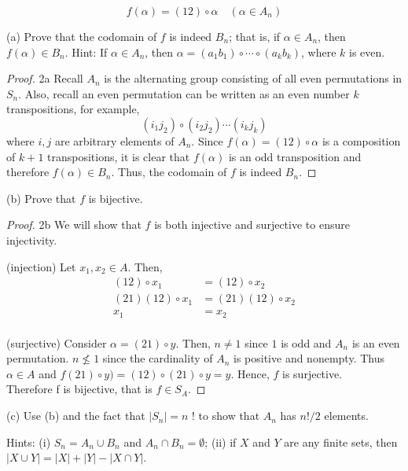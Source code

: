 \documentclass[12pt]{article}
\begin{document}
$$
f(\alpha)=(12) \circ \alpha \quad\left(\alpha \in A_{n}\right)
$$

(a) Prove that the codomain of $f$ is indeed $B_{n}$; that is, if $\alpha \in A_{n}$, then $f(\alpha) \in B_{n}$. Hint: If $\alpha \in A_{n}$, then $\alpha=\left(a_{1} b_{1}\right) \circ \cdots \circ\left(a_{k} b_{k}\right)$, where $k$ is even.

\begin{proof}{2a} 
	Recall $A_n$ is the alternating group consisting of all even
	permutations in $S_n$. Also, recall an even permutation can be written as an even
	number $k$ transpositions, for example, 
	$$
	(i_1j_2)\circ(i_2j_2) \cdots (i_kj_k)
	$$
	where $i,j$ are arbitrary elements of $A_n$.
	Since $f(\alpha)=(12)\circ \alpha$ is a composition of $k+1$
	transpositions, it is clear that $f(\alpha)$ is an odd 
	transposition and therefore $f(\alpha) \in B_n$. Thus,
	the codomain of $f$ is indeed $B_n$.
\end{proof}

(b) Prove that $f$ is bijective.

\begin{proof}{2b} We will show that $f$ is both injective and surjective to ensure injectivity.

	(injection) 
	Let $x_1, x_2 \in A$. Then,
		$$
		\begin{aligned}
			(12)\circ x_1 &= (12)\circ x_2 \\
			(21)(12)\circ x_1 &= (21)(12)\circ x_2 \\
			x_1 &= x_2 \\
		\end{aligned}
		$$
	
	(surjective)
	Consider $\alpha=(21)\circ y$.  Then,
	$n \neq 1$ since $1$ is odd and $A_n$ is an even permutation.
	$n \not\leq 1$ since the cardinality of $A_n$ is positive and nonempty.
	Thus $\alpha \in A$ and $f(21)\circ y) = (12)\circ(21)\circ y = y$. 
	Hence, $f$ is surjective. \\

	Therefore f is bijective, that is $f \in S_A$.



\end{proof}

(c) Use (b) and the fact that $\left|S_{n}\right|=n$ ! to show that $A_{n}$ has $n ! / 2$ elements.

Hints: (i) $S_{n}=A_{n} \cup B_{n}$ and $A_{n} \cap B_{n}=\emptyset$; (ii) if $X$ and $Y$ are any finite sets, then $|X \cup Y|=|X|+|Y|-|X \cap Y|$.
\end{document}
